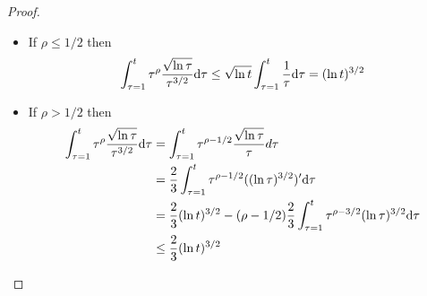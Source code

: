 \begin{proof}
  \begin{itemize}
    \item If
      $\rho\leq 1/2$ then
      \[
        \int_{\tau=1}^t \tau^\rho\frac{\sqrt{\ln \tau}}{\tau^{3/2}}\mathrm{d}\tau
        \leq
        \sqrt{\ln t }
        \int_{\tau=1}^t
        \frac{1}{\tau}\mathrm{d}\tau = (\ln t)^{3/2}
      \]
    \item If $\rho > 1/2$ then\\
      \begin{align*}
        \int_{\tau=1}^t
        \tau^\rho\frac{\sqrt{\ln \tau}}{\tau^{3/2}}\mathrm{d}\tau
        &=
        \int_{\tau=1}^t \tau^{\rho-1/2}\frac{\sqrt{\ln \tau}}{\tau}d\tau \\
        &=
        \frac{2}{3} \int_{\tau=1}^t
        \tau^{\rho-1/2}((\ln \tau)^{3/2})'\mathrm{d}\tau \\
        &=
        \frac{2}{3}(\ln t)^{3/2} - (\rho-1/2)\frac{2}{3}
        \int_{\tau=1}^t \tau^{\rho-3/2}(\ln \tau)^{3/2}\mathrm{d}\tau \\
        &\leq \frac{2}{3} (\ln t)^{3/2}
      \end{align*}
  \end{itemize}
\end{proof}
